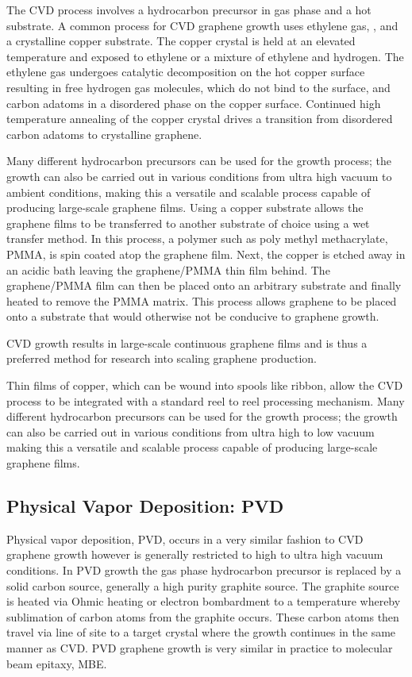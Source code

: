 The CVD process involves a hydrocarbon precursor in gas phase and a hot substrate. A common process for CVD graphene growth uses ethylene gas, , and a crystalline copper substrate. The copper crystal is held at an elevated temperature and exposed to ethylene or a mixture of ethylene and hydrogen. The ethylene gas undergoes catalytic decomposition on the hot copper surface resulting in free hydrogen gas molecules, which do not bind to the surface, and carbon adatoms in a disordered phase on the copper surface. Continued high temperature annealing of the copper crystal drives a transition from disordered carbon adatoms to crystalline graphene.

Many different hydrocarbon precursors can be used for the growth process; the growth can also be carried out in various conditions from ultra high vacuum to ambient conditions, making this a versatile and scalable process capable of producing large-scale graphene films. Using a copper substrate allows the graphene films to be transferred to another substrate of choice using a wet transfer method. In this process, a polymer such as poly methyl methacrylate, PMMA, is spin coated atop the graphene film. Next, the copper is etched away in an acidic bath leaving the graphene/PMMA thin film behind. The graphene/PMMA film can then be placed onto an arbitrary substrate and finally heated to remove the PMMA matrix. This process allows graphene to be placed onto a substrate that would otherwise not be conducive to graphene growth.

CVD growth results in large-scale continuous graphene films and is thus a preferred method for research into scaling graphene production.

Thin films of copper, which can be wound into spools like ribbon, allow the CVD process to be integrated with a standard reel to reel processing mechanism. Many different hydrocarbon precursors can be used for the growth process; the growth can also be carried out in various conditions from ultra high to low vacuum making this a versatile and scalable process capable of producing large-scale graphene films.

  \subsection{Physical Vapor Deposition: PVD}
 Physical vapor deposition, PVD, occurs in a very similar fashion to CVD graphene growth however is generally restricted to high to ultra high vacuum conditions. In PVD growth the gas phase hydrocarbon precursor is replaced by a solid carbon source, generally a high purity graphite source. The graphite source is heated via Ohmic heating or electron bombardment to a temperature whereby sublimation of carbon atoms from the graphite occurs. These carbon atoms then travel via line of site to a target crystal where the growth continues in the same manner as CVD. PVD graphene growth is very similar in practice to molecular beam epitaxy, MBE.

